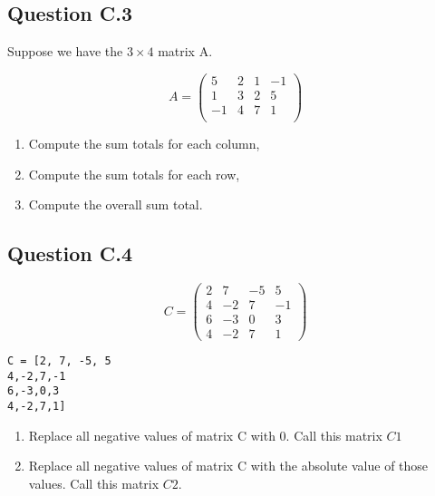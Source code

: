 \documentclass[12pt]{article}
\begin{document}
\subsection*{Question C.3}
Suppose we have the $3 \times 4$ matrix A.

\[ 
A = \left(
\begin{array}{cccc}
 5 & 2 & 1 & -1 \\ 
 1 & 3 & 2 & 5 \\ 
 -1 & 4 & 7 & 1 \\ 
\end{array} \right)
\]

\begin{enumerate}
\item Compute the sum totals for each column,
\item Compute the sum totals for each row,
\item Compute the overall sum total.
\end{enumerate}

\subsection*{Question C.4}

\[C = \left( \begin{array}{cccc}
2& 7& -5& 5\\
4&-2 & 7& -1\\
6&-3 & 0& 3 \\
4&-2 & 7& 1
\end{array} \right)
\]
\begin{framed}
\begin{verbatim}
C = [2, 7, -5, 5
4,-2,7,-1
6,-3,0,3
4,-2,7,1]

\end{verbatim}
\end{framed}
\begin{enumerate}
\item Replace all negative values of matrix C with 0. Call this matrix $C1$
\item Replace all negative values of matrix C with the absolute value of those values. Call this matrix $C2$.
\end{enumerate}
\end{document}
